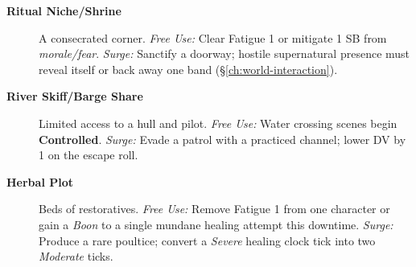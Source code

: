 \begin{description}
  \item[\textbf{Ritual Niche/Shrine}]  A consecrated corner. \emph{Free Use:} Clear Fatigue 1 or mitigate 1 SB from \emph{morale/fear}. \emph{Surge:} Sanctify a doorway; hostile supernatural presence must reveal itself or back away one band (\S\ref{ch:world-interaction}).
  \item[\textbf{River Skiff/Barge Share}]  Limited access to a hull and pilot. \emph{Free Use:} Water crossing scenes begin \textbf{Controlled}. \emph{Surge:} Evade a patrol with a practiced channel; lower DV by 1 on the escape roll.
  \item[\textbf{Herbal Plot}]  Beds of restoratives. \emph{Free Use:} Remove Fatigue 1 from one character or gain a \emph{Boon} to a single mundane healing attempt this downtime. \emph{Surge:} Produce a rare poultice; convert a \emph{Severe} healing clock tick into two \emph{Moderate} ticks.
\end{description}

